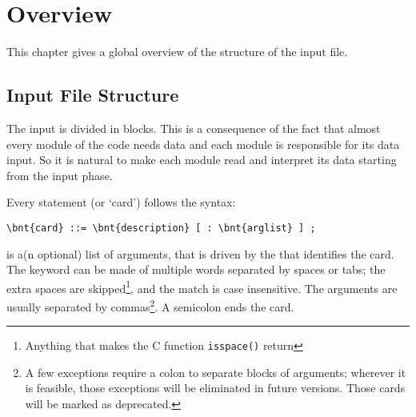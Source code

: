 %
%
%
%
%
% 
%
%

\chapter{Overview}\label{sec:OVERVIEW}
This chapter gives a global overview of the structure of the input file.


\section{Input File Structure}
The input is divided in blocks.
This is a consequence of the fact that almost every module of the code 
needs data and each module is responsible for its data input. 
So it is natural to make each module read and interpret its data starting 
from the input phase.

Every statement (or `card') follows the syntax:
\begin{Verbatim}[commandchars=\\\{\}]
    \bnt{card} ::= \bnt{description} [ : \bnt{arglist} ] ;
\end{Verbatim}
 is a(n optional) list of arguments, that is driven by the 
 that identifies the card. 
The keyword can be made of multiple words separated by spaces or tabs; 
the extra spaces are skipped\footnote{
	Anything that makes the C function \texttt{isspace()} 
	return 
}, and the match is case insensitive. 
The arguments are usually separated by commas\footnote{
	A few exceptions require a colon to separate blocks of arguments;
	wherever it is feasible, those exceptions will be eliminated 
	in future versions.
	Those cards will be marked as deprecated.
}.
A semicolon ends the card. 

